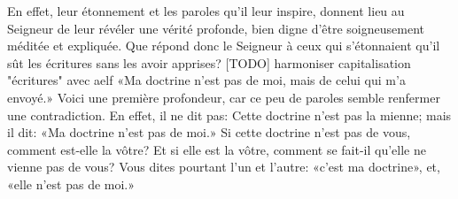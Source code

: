En effet, leur étonnement et les paroles qu’il leur inspire,
	donnent lieu au Seigneur de leur révéler une vérité profonde,
	bien digne d’être soigneusement méditée et expliquée.
Que répond donc le Seigneur à ceux qui s’étonnaient
	qu’il sût les écritures sans les avoir apprises? [TODO] harmoniser capitalisation "écritures" avec aelf
«Ma doctrine n’est pas de moi, mais de celui qui m’a envoyé.»
Voici une première profondeur,
	car ce peu de paroles semble renfermer une contradiction.
En effet, il ne dit pas: Cette doctrine n’est pas la mienne;
	mais il dit: «Ma doctrine n’est pas de moi.»
Si cette doctrine n’est pas de vous, comment est-elle la vôtre?
	Et si elle est la vôtre, comment se fait-il qu’elle ne vienne pas de vous?
Vous dites pourtant l’un et l’autre:
	«c’est ma doctrine», et, «elle n’est pas de moi.»
